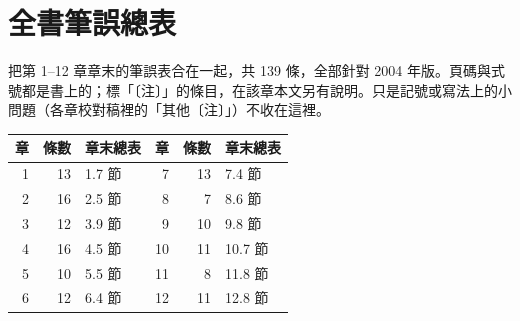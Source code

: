 \clearpage
\appendix
\section{全書筆誤總表}\label{app-errata}
把第 1--12 章章末的筆誤表合在一起，共 139 條，全部針對 2004 年版。頁碼與式號都是書上的；標「〔注〕」的條目，在該章本文另有說明。只是記號或寫法上的小問題（各章校對稿裡的「其他〔注〕」）不收在這裡。
\begin{center}
\small\setlength{\tabcolsep}{5pt}
\begin{tabular}{@{}rrl@{\qquad}rrl@{}}
\toprule
章 & 條數 & 章末總表 & 章 & 條數 & 章末總表\\
\midrule
1 & 13 & 1.7 節 & 7 & 13 & 7.4 節\\
2 & 16 & 2.5 節 & 8 & 7 & 8.6 節\\
3 & 12 & 3.9 節 & 9 & 10 & 9.8 節\\
4 & 16 & 4.5 節 & 10 & 11 & 10.7 節\\
5 & 10 & 5.5 節 & 11 & 8 & 11.8 節\\
6 & 12 & 6.4 節 & 12 & 11 & 12.8 節\\
\bottomrule
\end{tabular}
\end{center}

